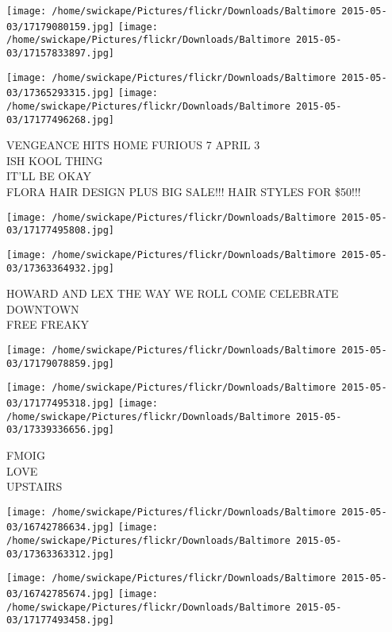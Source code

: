 \documentclass[10pt,letterpaper]{article}
\begin{document}
\texttt{[image: /home/swickape/Pictures/flickr/Downloads/Baltimore 2015-05-03/17179080159.jpg]}
\texttt{[image: /home/swickape/Pictures/flickr/Downloads/Baltimore 2015-05-03/17157833897.jpg]}

\texttt{[image: /home/swickape/Pictures/flickr/Downloads/Baltimore 2015-05-03/17365293315.jpg]}
\texttt{[image: /home/swickape/Pictures/flickr/Downloads/Baltimore 2015-05-03/17177496268.jpg]}

VENGEANCE HITS HOME FURIOUS 7 APRIL 3\\
ISH KOOL THING\\
IT'LL BE OKAY\\
FLORA HAIR DESIGN PLUS BIG SALE!!!  HAIR STYLES FOR \$50!!!\\
\pagebreak

\texttt{[image: /home/swickape/Pictures/flickr/Downloads/Baltimore 2015-05-03/17177495808.jpg]}

\vspace{0.25in}
\texttt{[image: /home/swickape/Pictures/flickr/Downloads/Baltimore 2015-05-03/17363364932.jpg]}

HOWARD AND LEX THE WAY WE ROLL COME CELEBRATE DOWNTOWN\\
FREE FREAKY\\
\pagebreak

\texttt{[image: /home/swickape/Pictures/flickr/Downloads/Baltimore 2015-05-03/17179078859.jpg]}

\vspace{0.25in}
\texttt{[image: /home/swickape/Pictures/flickr/Downloads/Baltimore 2015-05-03/17177495318.jpg]}
\texttt{[image: /home/swickape/Pictures/flickr/Downloads/Baltimore 2015-05-03/17339336656.jpg]}

FMOIG\\
LOVE\\
UPSTAIRS\\
\pagebreak

\texttt{[image: /home/swickape/Pictures/flickr/Downloads/Baltimore 2015-05-03/16742786634.jpg]}
\texttt{[image: /home/swickape/Pictures/flickr/Downloads/Baltimore 2015-05-03/17363363312.jpg]}

\texttt{[image: /home/swickape/Pictures/flickr/Downloads/Baltimore 2015-05-03/16742785674.jpg]}
\texttt{[image: /home/swickape/Pictures/flickr/Downloads/Baltimore 2015-05-03/17177493458.jpg]}
\end{document}
